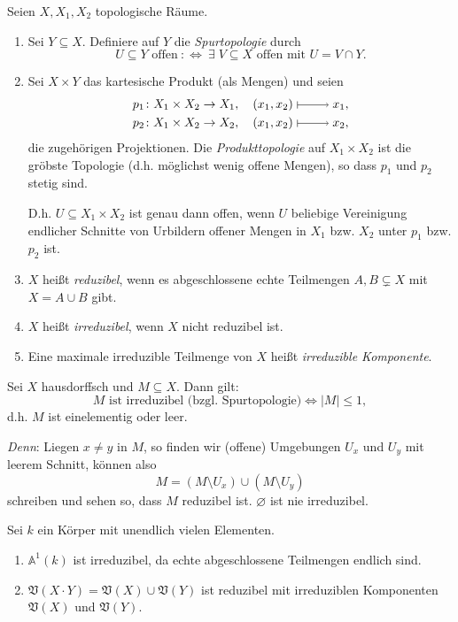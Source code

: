 \documentclass[a4paper,12pt]{scrbook}
\theoremstyle{keinenummern} %
\theoremstyle{mitnummern}
\theoremstyle{unserbeweis}
\def\A{\mathbb{A}}
\def\V{\mathfrak{V}}
\newcommand{\leer}{\ensuremath{\varnothing}}
\newcommand{\card}[1]{|#1|}
\renewcommand{\mapsto}{\raisebox{-1pt}{\tikz{\draw[thin,shorten >=3pt, |->] (0,0) node{\hspace*{0pt}} -- node{} (1,0);}}\penalty1000\relax}
\begin{document}
\begin{de}\label{1.2.6} Seien $X,X_{1},X_{2}$ topologische Räume.
\begin{enumerate}
\item Sei $Y\subseteq X$. Definiere auf $Y$ die \emph{Spurtopologie} durch
\[U\subseteq Y\text{ offen}\: :\Longleftrightarrow\:\exists\;V\subseteq X\text{ offen mit }U=V\cap Y.\]
\item Sei $X\times Y$ das kartesische Produkt (als Mengen) und seien
\begin{align*}p_{1}\colon X_{1}\times X_{2}\rightarrow X_{1},\quad(x_{1},x_{2})\mapsto x_{1},\\p_{2}\colon X_{1}\times X_{2}\rightarrow X_{2},\quad(x_{1},x_{2})\mapsto x_{2},\end{align*}
die zugehörigen Projektionen. Die \emph{Produkttopologie} auf $X_{1}\times X_{2}$ ist die gröbste Topologie (d.h. möglichst wenig offene Mengen), so dass $p_{1}$ und $p_{2}$ stetig sind.

D.h. $U\subseteq X_{1}\times X_{2}$ ist genau dann offen, wenn $U$ beliebige Vereinigung endlicher Schnitte von Urbildern offener Mengen in $X_{1}$ bzw. $X_{2}$ unter $p_{1}$ bzw. $p_{2}$ ist.

\item $X$ heißt \emph{reduzibel}, wenn es abgeschlossene echte Teilmengen $A,B\subsetneq X$ mit $X=A\cup B$ gibt.

\item $X$ heißt \emph{irreduzibel}, wenn $X$ nicht reduzibel ist.

\item Eine maximale irreduzible Teilmenge von $X$ heißt \emph{irreduzible Komponente}.
\end{enumerate}\end{de}

\begin{bsp}\label{1.2.7}
Sei $X$ hausdorffsch und $M\subseteq X$. Dann gilt:
\[M\text{ ist irreduzibel (bzgl. Spurtopologie)}\iff \card{M}\leq 1,\]
d.h. $M$ ist einelementig oder leer.

\emph{Denn}: Liegen $x\neq y$ in $M$, so finden wir (offene) Umgebungen $U_{x}$ und $U_{y}$ mit leerem Schnitt, können also
\[M=(M\setminus U_{x})\cup(M\setminus U_{y})\]
schreiben und sehen so, dass $M$ reduzibel ist. $\leer$ ist nie irreduzibel.
\end{bsp}

\begin{bsp}\label{1.2.8} Sei $k$ ein Körper mit unendlich vielen Elementen.
\begin{enumerate}
\item{} $\A^{1}(k)$ ist irreduzibel, da echte abgeschlossene Teilmengen endlich sind.
\item\label{1.2.8b} $\V(X\cdot Y) = \V(X)\cup\V(Y)$ ist reduzibel mit irreduziblen Komponenten $\V(X)$ und $\V(Y)$.
\end{enumerate}\end{bsp}
\end{document}
